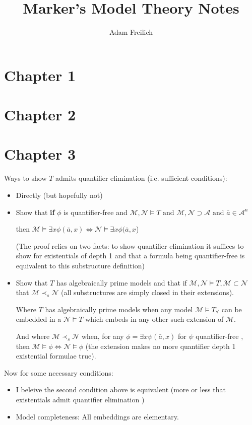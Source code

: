 \documentclass[10pt]{article}
\author{Adam Freilich}
\title{Marker's Model Theory Notes}
\newcommand{\A}{\forall}
\newcommand{\E}{\exists}
\newcommand{\mcA}{\mathcal{A}}
\newcommand{\mcM}{\mathcal{M}}
\newcommand{\mcN}{\mathcal{N}}
\newcommand{\qf}{quantifier-free }
\newcommand{\qe}{quantifier elimination }
\begin{document}
\maketitle

\section{Chapter 1}
\section{Chapter 2}
\section{Chapter 3}
Ways to show \(T\) admits quantifier elimination (i.e. sufficient conditions):

\begin{itemize}
\item Directly (but hopefully not)
\item Show that \textbf{if} \(\phi\) is \qf and \(\mcM, \mcN \models T \text{ and } \mcM, \mcN \supset \mcA \text{ and } \bar{a} \in \mcA^n\) 

then \(\mcM \models \exists x \phi(\bar{a}, x) \iff \mcN \models \exists x \phi(\bar{a}, x\))

(The proof relies on two facts: to show \qe it suffices to show for existentials of depth 1 and that a formula being \qf is equivalent to this substructure definition)

\item Show that \(T\) has algebraically prime models and that if \(\mcM, \mcN \models T, \mcM \subset \mcN\) that \(\mcM \prec_s \mcN\) (all substructures are simply closed in their extensions).

Where \(T\) has algebraically prime models when any model \(\mcM \models T_\A\) can be embedded in a \(\mcN \models T\) which embeds in any other such extension of \(\mcM\). 

And where \(\mcM \prec_s \mcN\) when, for any \(\phi = \E x \psi(\bar{a}, x)\) for \(\psi\) \qf, then \(\mcM \models \phi \iff \mcN \models \phi\) (the extension makes no more quantifier depth 1 existential formulae true).

\end{itemize}

Now for some necessary conditions: 
\begin{itemize}

\item I beleive the second condition above is equivalent (more or less that existentials admit \qe)

\item Model completeness: All embeddings are elementary. 

\end{itemize}
\end{document}
